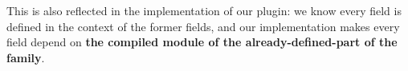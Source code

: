 This is also reflected in the implementation of our plugin: we know
every field is defined in the context of the former fields, and our
implementation makes every field depend on \textbf{the
compiled module of the already-defined-part of the family}. 

